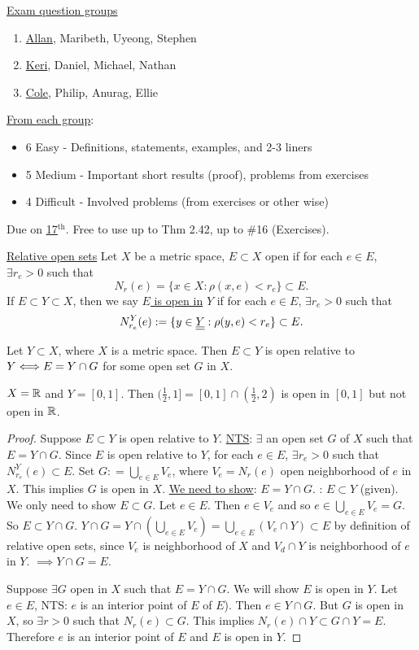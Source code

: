 \documentclass[]{article}
\begin{document}
\ul{Exam question groups}
\begin{enumerate}
	\item \ul{Allan}, Maribeth, Uyeong, Stephen
	\item \ul{Keri}, Daniel, Michael, Nathan
	\item \ul{Cole}, Philip, Anurag, Ellie
\end{enumerate}
\ul{From each group}:
\begin{itemize}
	\item 6 Easy - Definitions, statements, examples, and 2-3 liners
	\item 5 Medium - Important short results (proof), problems from exercises
	\item 4 Difficult - Involved problems (from exercises or other wise)
\end{itemize}
Due on \ul{\ul{17$^\text{th}$}}.
Free to use up to Thm 2.42, up to \#16 (Exercises).

\ul{Relative open sets}
Let $X$ be a metric space, $E\subset X$ open if for each $e\in E$, $\exists r_e>0$ such that $$N_r(e) = \{x\in X:\rho(x,e)<r_e\} \subset E.$$
If $E\subset Y\subset X$, then we say \ul{$E$ is open in} $Y$ if for each $e\in E$, $\exists r_e>0$ such that $$N_{r_e}^Y(e) := \{y\in \underline{\underline{Y}}:\rho(y,e)< r_e\} \subset E.$$

\begin{theorem}
	Let $Y\subset X$, where $X$ is a metric space. Then $E\subset Y$ is open relative to $Y \Longleftrightarrow E = Y\cap G$ for some open set $G$ in $X$.
\end{theorem}
\begin{example}
	$X = \mathbb{R}$ and $Y = [0,1]$. Then $(\frac{1}{2},1] = [0,1]\cap(\frac{1}{2},2)$ is open in $[0,1]$ but not open in $\mathbb{R}$.
\end{example}
\begin{proof}
	\say{$\implies$} Suppose $E\subset Y$ is open relative to $Y$.
	\ul{\ul{NTS}}: $\exists$ an open set $G$ of $X$ such that $E = Y\cap G$.
	Since $E$ is open relative to $Y$, for each $e\in E$, $\exists r_e>0$ such that $N_{r_e}^Y(e) \subset E$.
	Set $G: = \bigcup_{e\in E} V_e$, where $V_e = N_r(e)$ open neighborhood of $e$ in $X$.
	This implies $G$ is open in $X$.
	\ul{We need to show}: $E = Y\cap G$.
	\say{$\subset$}: $E\subset Y$ (given). We only need to show $E\subset G$.
	Let $e\in E$. Then $e\in V_e$ and so $e\in \bigcup_{e\in E} V_e = G$.
	So $E\subset Y\cap G$.
	\say{$\supset$} $Y\cap G = Y\cap\left(\bigcup_{e\in E} V_e\right) = \bigcup_{e\in E} (V_e \cap Y) \subset E$ by definition of relative open sets, since $V_e$ is neighborhood of $X$ and $V_d\cap Y$ is neighborhood of $e$ in $Y$.
	$\implies Y\cap G = E$.

	\say{$\Lla$} Suppose $\exists G$ open in $X$ such that $E = Y\cap G$. We will show $E$ is open in $Y$.
	Let $e\in E$, NTS: $e$ is an interior point of $E$ of $E$).
	Then $e\in Y\cap G$. But $G$ is open in $X$, so $\exists r>0$ such that $N_r(e) \subset G$.
	This implies $N_r(e)\cap Y\subset G\cap Y = E$.
	Therefore $e$ is an interior point of $E$ and $E$ is open in $Y$.
\end{proof}
\end{document}
